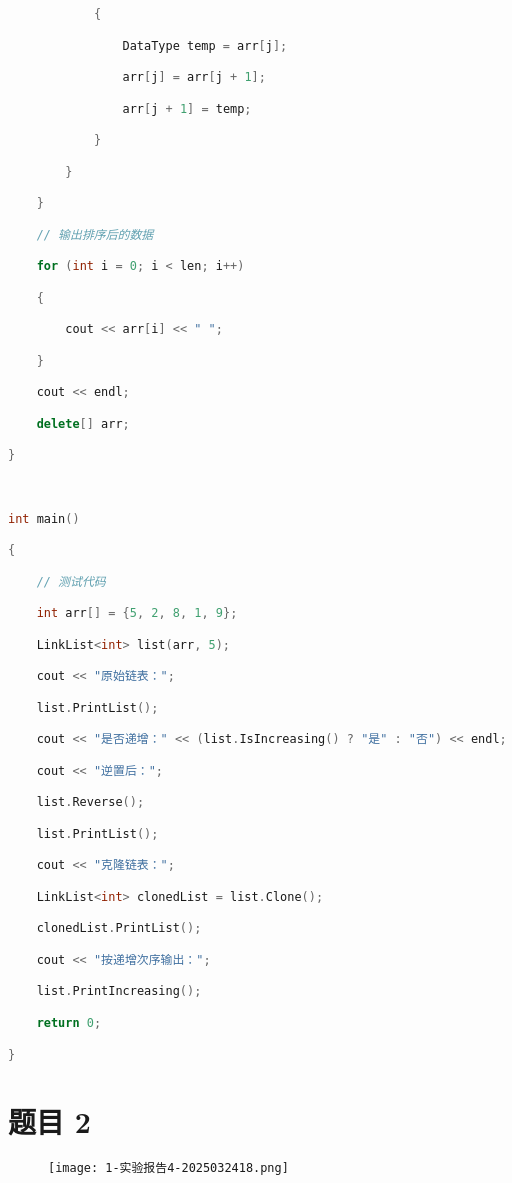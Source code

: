 \begin{lstlisting}[language=C++]
            {

                DataType temp = arr[j];

                arr[j] = arr[j + 1];

                arr[j + 1] = temp;

            }

        }

    }

    // 输出排序后的数据

    for (int i = 0; i < len; i++)

    {

        cout << arr[i] << " ";

    }

    cout << endl;

    delete[] arr;

}

  

int main()

{

    // 测试代码

    int arr[] = {5, 2, 8, 1, 9};

    LinkList<int> list(arr, 5);

    cout << "原始链表：";

    list.PrintList();

    cout << "是否递增：" << (list.IsIncreasing() ? "是" : "否") << endl;

    cout << "逆置后：";

    list.Reverse();

    list.PrintList();

    cout << "克隆链表：";

    LinkList<int> clonedList = list.Clone();

    clonedList.PrintList();

    cout << "按递增次序输出：";

    list.PrintIncreasing();

    return 0;

}
\end{lstlisting}
\section{题目 2}

\begin{figure}[H]
\centering
\texttt{[image: 1-实验报告4-2025032418.png]}
\label{}
\end{figure}

